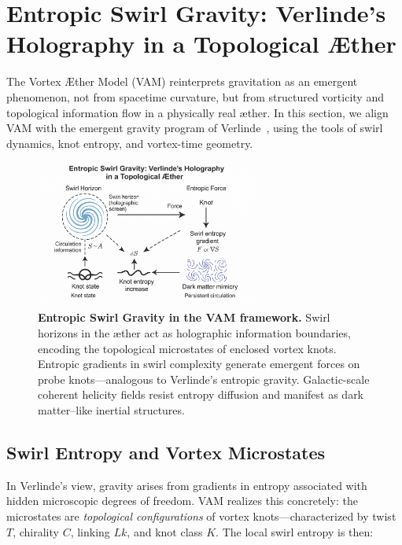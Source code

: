 \section{Entropic Swirl Gravity: Verlinde's Holography in a Topological Æther}

The Vortex \AE{}ther Model (VAM) reinterprets gravitation as an emergent phenomenon, not from spacetime curvature, but from structured vorticity and topological information flow in a physically real æther. In this section, we align VAM with the emergent gravity program of Verlinde~\cite{Verlinde2011,Verlinde2016,verlinde2017emergent}, using the tools of swirl dynamics, knot entropy, and vortex-time geometry.

\begin{figure}[h!]
\centering
\includegraphics[width=0.65\textwidth]{images/ErikVerlinde}
\caption{%
\textbf{Entropic Swirl Gravity in the VAM framework.}
Swirl horizons in the æther act as holographic information boundaries, encoding the topological microstates of enclosed vortex knots. Entropic gradients in swirl complexity generate emergent forces on probe knots—analogous to Verlinde's entropic gravity. Galactic-scale coherent helicity fields resist entropy diffusion and manifest as dark matter–like inertial structures.
}
\end{figure}

\subsection*{Swirl Entropy and Vortex Microstates}

In Verlinde’s view, gravity arises from gradients in entropy associated with hidden microscopic degrees of freedom. VAM realizes this concretely: the microstates are \emph{topological configurations} of vortex knots—characterized by twist \( T \), chirality \( C \), linking \( Lk \), and knot class \( K \). The local swirl entropy is then:

